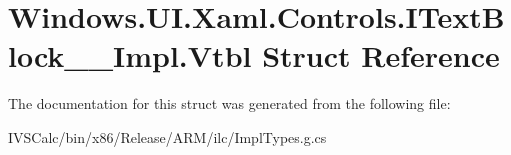 \hypertarget{struct_windows_1_1_u_i_1_1_xaml_1_1_controls_1_1_i_text_block_____impl_1_1_vtbl}{}\section{Windows.\+U\+I.\+Xaml.\+Controls.\+I\+Text\+Block\+\_\+\+\_\+\+Impl.\+Vtbl Struct Reference}
\label{struct_windows_1_1_u_i_1_1_xaml_1_1_controls_1_1_i_text_block_____impl_1_1_vtbl}


The documentation for this struct was generated from the following file\+:\begin{DoxyCompactItemize}
\item 
I\+V\+S\+Calc/bin/x86/\+Release/\+A\+R\+M/ilc/Impl\+Types.\+g.\+cs\end{DoxyCompactItemize}
